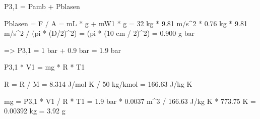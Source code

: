 P3,1 = Pamb + Pblasen

Pblasen = F / A = mL * g + mW1 * g = 32 kg * 9.81 m/s^2 * 0.76 kg * 9.81 m/s^2 / (pi * (D/2)^2) = (pi * (10 cm / 2)^2) = 0.900 g bar

=> P3,1 = 1 bar + 0.9 bar = 1.9 bar

P3,1 * V1 = mg * R * T1

R = R / M = 8.314 J/mol K / 50 kg/kmol = 166.63 J/kg K

mg = P3,1 * V1 / R * T1 = 1.9 bar * 0.0037 m^3 / 166.63 J/kg K * 773.75 K = 0.00392 kg = 3.92 g